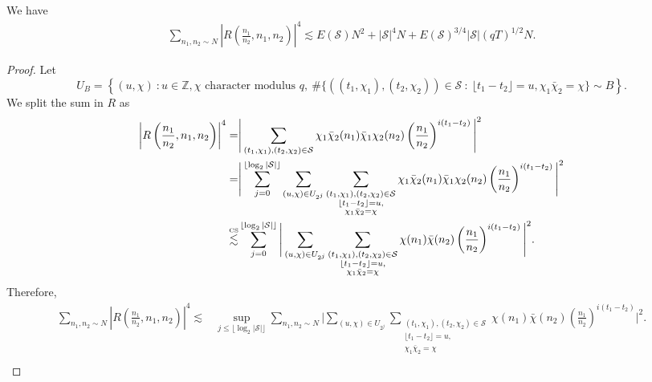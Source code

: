\begin{lemma}
    We have \begin{align*}
        \sum_{n_1,n_2\sim N}  \left|R\left(\frac{n_1}{n_2} ,n_1,n_2\right) \right|^4 \lesssim E(\mathcal{S})N^2+ |\mathcal{S}|^4N +  E(\mathcal{S})^{3/4}|\mathcal{S}|(qT)^{1/2}N.
    \end{align*}
\end{lemma}
\begin{proof}
    Let \[
    U_B=\left\{(u,\chi) \ : u\in \mathbb{Z},\chi \textrm{ character modulus $q$}, \ \#\{((t_1,\chi_1),(t_2,\chi_2))\in \mathcal{S} \ : \ \lfloor {t_1-t_2}\rfloor = u, \chi_1\bar\chi_2=\chi\} \sim B \right\}.
    \]
    We split the sum in $R$ as \begin{align*}
        \left|R\left(\frac{n_1}{n_2} ,n_1,n_2\right) \right|^4 =&
        \Bigg|
        \sum_{(t_1,\chi_1),(t_2,\chi_2)\in \mathcal{S}}
        \chi_1\bar{\chi}_2(n_1)\bar\chi_1{\chi}_2(n_2) \left(\frac{n_1}{n_2}\right)^{i(t_1-t_2)}\Bigg|^2 \\
        =& \Bigg|
        \sum_{j=0}^{ \lfloor \log_2 |\mathcal{S}|\rfloor} \sum_{(u,\chi)\in U_{2^j}}\sum_{\substack{(t_1,\chi_1),(t_2,\chi_2)\in \mathcal{S}\\ \lfloor t_1-t_2 \rfloor = u,\\ \chi_1\bar\chi_2=\chi}} 
        \chi_1\bar{\chi}_2(n_1)\bar\chi_1{\chi}_2(n_2)  \left(\frac{n_1}{n_2}\right)^{i(t_1-t_2)}\Bigg|^2\\
        \stackon{CS}{\lesssim}& \sum_{j=0}^{ \lfloor \log_2 |\mathcal{S}|\rfloor} \Bigg|
         \sum_{(u,\chi)\in U_{2^j}}\sum_{\substack{(t_1,\chi_1),(t_2,\chi_2)\in \mathcal{S}\\ \lfloor t_1-t_2 \rfloor = u,\\ \chi_1\bar\chi_2=\chi}} 
         \chi(n_1)\bar\chi(n_2)  \left(\frac{n_1}{n_2}\right)^{i(t_1-t_2)}\Bigg|^2.
    \end{align*}
    Therefore, \begin{align*}
        \sum_{n_1,n_2\sim N}\left|R\left(\frac{n_1}{n_2},n_1,n_2\right) \right|^4 \lesssim & 
        \sup_{j\leq \lfloor \log_2 |\mathcal{S}|\rfloor} \sum_{n_1,n_2\sim N} \Bigg|
        \sum_{(u,\chi)\in U_{2^j}}\sum_{\substack{(t_1,\chi_1),(t_2,\chi_2)\in \mathcal{S}\\ \lfloor t_1-t_2 \rfloor = u,\\ \chi_1\bar\chi_2=\chi}} 
       \chi(n_1)\bar{\chi}(n_2) \left(\frac{n_1}{n_2}\right)^{i(t_1-t_2)}\Bigg|^2.\\
    \end{align*}

\end{proof}
